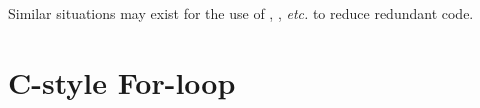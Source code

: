 %        
%        

%        
%        

%
%    


Similar situations may exist for the use of , , \textit{etc.} to reduce
redundant code.


\section{C-style For-loop}\label{sec:for-loop}

